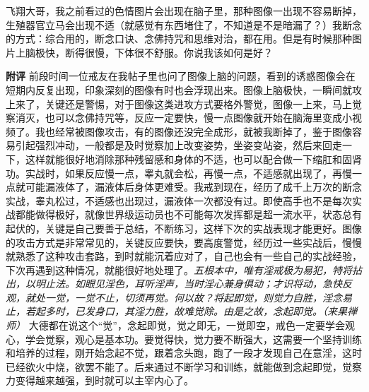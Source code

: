 \begin{case}
    飞翔大哥，我之前看过的色情图片会出现在脑子里，那种图像一出现不容易断掉，生殖器官立马会出现不适（就感觉有东西堵住了，不知道是不是暗漏了？）我断念的方式：综合用的，断念口诀、念佛持咒和思维对治，都在用。但是有时候那种图片上脑极快，断得很慢，下体很不舒服。你说我该如何是好？

    \textbf{附评} 前段时间一位戒友在我帖子里也问了图像上脑的问题，看到的诱惑图像会在短期内反复出现，印象深刻的图像有时也会浮现出来。图像上脑极快，一瞬间就攻上来了，关键还是警惕，对于图像这类进攻方式要格外警觉，图像一上来，马上觉察消灭，也可以念佛持咒等，反应一定要快，慢一点图像就开始在脑海里变成小视频了。我也经常被图像攻击，有的图像还没完全成形，就被我断掉了，鉴于图像容易引起强烈冲动，一般都是及时觉察加上改变姿势，坐姿变站姿，然后来回走一下，这样就能很好地消除那种残留感和身体的不适，也可以配合做一下缩肛和固肾功。实战时，如果反应慢一点，睾丸就会松，再慢一点，不适感就出现了，再慢一点就可能漏液体了，漏液体后身体更难受。我戒到现在，经历了成千上万次的断念实战，睾丸松过，不适感也出现过，漏液体一次都没有过。即使高手也不是每次实战都能做得极好，就像世界级运动员也不可能每次发挥都是超一流水平，状态总有起伏的，关键是自己要善于总结，不断练习，这样下次的实战表现才能更好。图像的攻击方式是非常常见的，关键反应要快，要高度警觉，经历过一些实战后，慢慢就熟悉了这种攻击套路，到时就能沉着应对了，自己也会有一些自己的实战经验，下次再遇到这种情况，就能很好地处理了。\textit{五根本中，唯有淫戒极为易犯，特将拈出，以明止法。如眼见淫色，耳听淫声，当时淫心兼身俱动；才识将动，急快反观，就处一觉，一觉不止，切须再觉。何以故？将起即觉，则觉力自胜，淫念易止，若起多时，已发身口，其淫力胜，故难觉除。由是之故，念起即觉。（来果禅师）} 大德都在说这个“觉”，念起即觉，觉之即无，一觉即空，戒色一定要学会观心，学会觉察，观心是基本功。要觉得快，觉力要不断强大，这需要一个坚持训练和培养的过程，刚开始念起不觉，跟着念头跑，跑了一段才发现自己在意淫，这时已经欲火中烧，欲罢不能了。后来通过不断学习和训练，就能做到念起即觉，觉察力变得越来越强，到时就可以主宰内心了。
\end{case}

